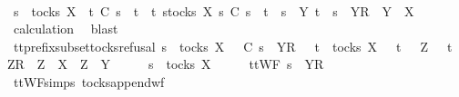 \begin{isabellebody}
\ \ \ \ \isamarkupfalse%
\isanewline
\ \ \isamarkupfalse%
\ \isamarkupfalse%
\ {\isachardoublequoteopen}s\ {\isasymin}\ tocks\ X\ {\isasymLongrightarrow}\ t\ {\isasymlesssim}\isactrlsub C\ s\ {\isasymLongrightarrow}\ t\ {\isasymin}\ {\isacharbraceleft}t{\isachardot}\ {\isasymexists}s{\isacharprime}{\isasymin}tocks\ X{\isachardot}\ s{\isacharprime}\ {\isasymlesssim}\isactrlsub C\ s\ {\isasymand}\ {\isacharparenleft}t\ {\isacharequal}\ s{\isacharprime}\ {\isasymor}\ {\isacharparenleft}{\isasymexists}Y{\isachardot}\ t\ {\isacharequal}\ s{\isacharprime}\ {\isacharat}\ {\isacharbrackleft}{\isacharbrackleft}Y{\isacharbrackright}\isactrlsub R{\isacharbrackright}\ {\isasymand}\ Y\ {\isasymsubseteq}\ X{\isacharparenright}{\isacharparenright}{\isacharbraceright}{\isachardoublequoteclose}\isanewline
\ \ \ \ \isamarkupfalse%
\ calculation\ \isamarkupfalse%
\ blast\isanewline
{}\isamarkupfalse%
%
\endisatagproof
{\isafoldproof}%
%
\isadelimproof
\isanewline
%
\endisadelimproof
\isanewline
{}\isamarkupfalse%
\ tt{\isacharunderscore}prefix{\isacharunderscore}subset{\isacharunderscore}tocks{\isacharunderscore}refusal{\isacharcolon}\ {\isachardoublequoteopen}s\ {\isasymin}\ tocks\ X\ {\isasymLongrightarrow}\ {\isasymrho}\ {\isasymlesssim}\isactrlsub C\ s\ {\isacharat}\ {\isacharbrackleft}{\isacharbrackleft}Y{\isacharbrackright}\isactrlsub R{\isacharbrackright}\ {\isasymLongrightarrow}\ {\isacharparenleft}{\isasymexists}\ t\ {\isasymin}\ tocks\ X{\isachardot}\ {\isasymrho}\ {\isacharequal}\ t\ {\isasymor}\ {\isacharparenleft}{\isasymexists}\ Z{\isachardot}\ {\isasymrho}\ {\isacharequal}\ t\ {\isacharat}\ {\isacharbrackleft}{\isacharbrackleft}Z{\isacharbrackright}\isactrlsub R{\isacharbrackright}\ {\isasymand}\ {\isacharparenleft}Z\ {\isasymsubseteq}\ X\ {\isasymor}\ Z\ {\isasymsubseteq}\ Y{\isacharparenright}{\isacharparenright}{\isacharparenright}{\isachardoublequoteclose}\isanewline
%
\isadelimproof
%
\endisadelimproof
%
\isatagproof
{}\isamarkupfalse%
\ {\isacharminus}\isanewline
\ \ \isamarkupfalse%
\ {\isachardoublequoteopen}s\ {\isasymin}\ tocks\ X{\isachardoublequoteclose}\isanewline
\ \ \isamarkupfalse%
\ \isamarkupfalse%
\ {\isachardoublequoteopen}ttWF\ {\isacharparenleft}s\ {\isacharat}\ {\isacharbrackleft}{\isacharbrackleft}Y{\isacharbrackright}\isactrlsub R{\isacharbrackright}{\isacharparenright}{\isachardoublequoteclose}\isanewline
\ \ \ \ \isamarkupfalse%
\ ttWF{\isachardot}simps{\isacharparenleft}{}{\isacharparenright}\ tocks{\isacharunderscore}append{\isacharunderscore}wf\ \isamarkupfalse%

\end{isabellebody}
